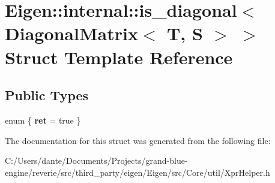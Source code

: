 \hypertarget{struct_eigen_1_1internal_1_1is__diagonal_3_01_diagonal_matrix_3_01_t_00_01_s_01_4_01_4}{}\section{Eigen\+::internal\+::is\+\_\+diagonal$<$ Diagonal\+Matrix$<$ T, S $>$ $>$ Struct Template Reference}
\label{struct_eigen_1_1internal_1_1is__diagonal_3_01_diagonal_matrix_3_01_t_00_01_s_01_4_01_4}
\subsection*{Public Types}
\begin{DoxyCompactItemize}
\item 
\mbox{\label{struct_eigen_1_1internal_1_1is__diagonal_3_01_diagonal_matrix_3_01_t_00_01_s_01_4_01_4_ab903d993f1f2e05bfe649f7c70bdd6b0}} 
enum \{ {\bfseries ret} = true
 \}
\end{DoxyCompactItemize}


The documentation for this struct was generated from the following file\+:\begin{DoxyCompactItemize}
\item 
C\+:/\+Users/dante/\+Documents/\+Projects/grand-\/blue-\/engine/reverie/src/third\+\_\+party/eigen/\+Eigen/src/\+Core/util/Xpr\+Helper.\+h\end{DoxyCompactItemize}
